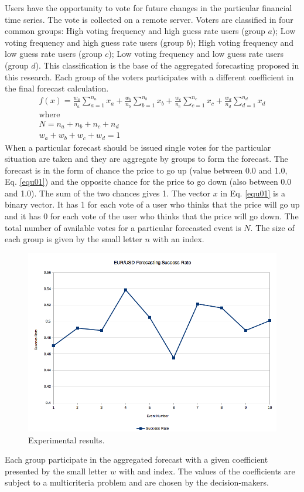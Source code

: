 \documentclass[runningheads]{llncs}
\begin{document}
Users have the opportunity to vote for future changes in the particular financial time series. The vote is collected on a remote server. Voters are classified in four common groups: High voting frequency and high guess rate users (group $a$); Low voting frequency and high guess rate users (group $b$); High voting frequency and low guess rate users (group $c$); Low voting frequency and low guess rate users (group $d$). This classification is the base of the aggregated forecasting proposed in this research. Each group of the voters participates with a different coefficient in the final forecast calculation. 
%
\begin{equation}
\begin{array}{l}
f(x) = \frac{w_{a}}{n_{a}} \sum_{a=1}^{n_{a}} x_{a} + \frac{w_{b}}{n_{b}} \sum_{b=1}^{n_{b}} x_{b} + \frac{w_{c}}{n_{c}} \sum_{c=1}^{n_{c}} x_{c} + \frac{w_{d}}{n_{d}} \sum_{d=1}^{n_{d}} x_{d} \\
\text{where} \\
N = n_{a} + n_{b} + n_{c} + n_{d} \\
w_{a} + w_{b} + w_{c} + w_{d} = 1
\end{array}
\label{equ01}
\end{equation}
%
When a particular forecast should be issued single votes for the particular situation are taken and they are aggregate by groups to form the forecast. The forecast is in the form of chance the price to go up (value between 0.0 and 1.0, Eq. \ref{equ01}) and the opposite chance for the price to go down (also between 0.0 and 1.0). The sum of the two chances gives 1. The vector $x$ in Eq. \ref{equ01} is a binary vector. It has 1 for each vote of a user who thinks that the price will go up and it has 0 for each vote of the user who thinks that the price will go down. The total number of available votes for a particular forecasted event is $N$. The size of each group is given by the small letter $n$ with an index. 
%
\begin{figure}
\includegraphics[width=\textwidth]{fig05.png}
\caption{Experimental results.}
\label{fig05}
\end{figure}
%
Each group participate in the aggregated forecast with a given coefficient presented by the small letter $w$ with and index. The values of the coefficients are subject to a multicriteria problem and are chosen by the decision-makers.
%
\end{document}
